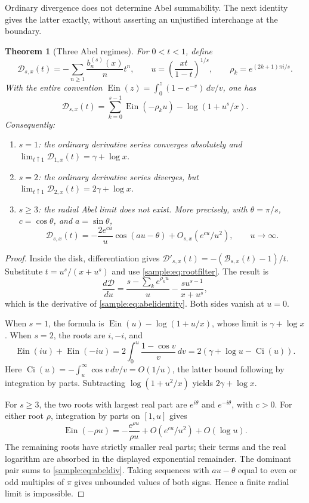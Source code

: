 \documentclass[11pt,a4paper]{article}
\DeclareMathOperator{\Ein}{Ein}
\DeclareMathOperator{\Ci}{Ci}
\newtheorem{theorem}{Theorem}[section]
\theoremstyle{definition}
\theoremstyle{remark}
\numberwithin{equation}{section}
\begin{document}
Ordinary divergence does not determine Abel summability. The next
identity gives the latter exactly, without asserting an unjustified
interchange at the boundary.

\begin{theorem}[Three Abel regimes]\label{sample:thm:abel}
For $0<t<1$, define
\[
\mathcal D_{s,x}(t)=-\sum_{n\ge1}\frac{b_n^{(s)}(x)}n t^n,
\qquad
u=\left(\frac{xt}{1-t}\right)^{1/s},\qquad
\rho_k=e^{(2k+1)\pi i/s}.
\]
With the entire convention
$\Ein(z)=\int_0^z(1-e^{-v})\,dv/v$, one has
\begin{equation}\label{sample:eq:abelidentity}
\mathcal D_{s,x}(t)=
\sum_{k=0}^{s-1}\Ein(-\rho_ku)-\log(1+u^s/x).
\end{equation}
Consequently:
\begin{enumerate}
\item $s=1$: the ordinary derivative series converges absolutely and
$\lim_{t\uparrow1}\mathcal D_{1,x}(t)=\gamma+\log x$.
\item $s=2$: the ordinary derivative series diverges, but
$\lim_{t\uparrow1}\mathcal D_{2,x}(t)=2\gamma+\log x$.
\item $s\ge3$: the radial Abel limit does not exist. More precisely,
with $\theta=\pi/s$, $c=\cos\theta$, and $a=\sin\theta$,
\begin{equation}\label{sample:eq:abeldiv}
\mathcal D_{s,x}(t)
=-\frac{2e^{cu}}u\cos(au-\theta)
+O_{s,x}(e^{cu}/u^2),\qquad u\to\infty.
\end{equation}
\end{enumerate}
\end{theorem}
\begin{proof}
Inside the disk, differentiation gives
$\mathcal D'_{s,x}(t)=-(\mathcal B_{s,x}(t)-1)/t$.
Substitute $t=u^s/(x+u^s)$ and use
\eqref{sample:eq:rootfilter}. The result is
\[
\frac{d\mathcal D}{du}
=\frac{s-\sum_ke^{\rho_ku}}u
-\frac{s u^{s-1}}{x+u^s},
\]
which is the derivative of \eqref{sample:eq:abelidentity}. Both sides vanish
at $u=0$.

When $s=1$, the formula is
$\Ein(u)-\log(1+u/x)$, whose limit is $\gamma+\log x$.
When $s=2$, the roots are $i,-i$, and
\[
\Ein(iu)+\Ein(-iu)
=2\int_0^u\frac{1-\cos v}{v}\,dv
=2(\gamma+\log u-\Ci(u)).
\]
Here $\Ci(u)=-\int_u^\infty\cos v\,dv/v=O(1/u)$, the latter bound
following by integration by parts. Subtracting
$\log(1+u^2/x)$ yields $2\gamma+\log x$.

For $s\ge3$, the two roots with largest real part are
$e^{i\theta}$ and $e^{-i\theta}$, with $c>0$.
For either root $\rho$, integration by parts on $[1,u]$ gives
\[
\Ein(-\rho u)=-\frac{e^{\rho u}}{\rho u}
+O(e^{cu}/u^2)+O(\log u).
\]
The remaining roots have strictly smaller real parts; their terms and
the real logarithm are absorbed in the displayed exponential remainder.
The dominant pair sums to \eqref{sample:eq:abeldiv}. Taking sequences with
$au-\theta$ equal to even or odd multiples of $\pi$ gives unbounded
values of both signs. Hence a finite radial limit is impossible.
\end{proof}
\end{document}
